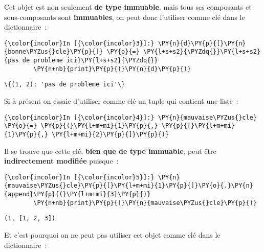     Cet objet est non seulement \textbf{de type immuable}, mais tous ses
composants et sous-composants sont \textbf{immuables}, on peut donc
l'utiliser comme clé dans le dictionnaire~:

    \begin{Verbatim}[commandchars=\\\{\},frame=single,framerule=0.3mm,rulecolor=\color{cellframecolor}]
{\color{incolor}In [{\color{incolor}3}]:} \PY{n}{d}\PY{p}{[}\PY{n}{bonne\PYZus{}cle}\PY{p}{]} \PY{o}{=} \PY{l+s+s2}{\PYZdq{}}\PY{l+s+s2}{pas de probleme ici}\PY{l+s+s2}{\PYZdq{}}
        \PY{n+nb}{print}\PY{p}{(}\PY{n}{d}\PY{p}{)}
\end{Verbatim}


    \begin{Verbatim}[commandchars=\\\{\},frame=single,framerule=0.3mm,rulecolor=\color{cellframecolor}]
\{(1, 2): 'pas de probleme ici'\}
\end{Verbatim}

    Si à présent on essaie d'utiliser comme clé un tuple qui contient une
liste~:

    \begin{Verbatim}[commandchars=\\\{\},frame=single,framerule=0.3mm,rulecolor=\color{cellframecolor}]
{\color{incolor}In [{\color{incolor}4}]:} \PY{n}{mauvaise\PYZus{}cle} \PY{o}{=} \PY{p}{(}\PY{l+m+mi}{1}\PY{p}{,} \PY{p}{[}\PY{l+m+mi}{1}\PY{p}{,} \PY{l+m+mi}{2}\PY{p}{]}\PY{p}{)}
\end{Verbatim}


    Il se trouve que cette clé, \textbf{bien que de type immuable}, peut
être \textbf{indirectement modifiée} puisque~:

    \begin{Verbatim}[commandchars=\\\{\},frame=single,framerule=0.3mm,rulecolor=\color{cellframecolor}]
{\color{incolor}In [{\color{incolor}5}]:} \PY{n}{mauvaise\PYZus{}cle}\PY{p}{[}\PY{l+m+mi}{1}\PY{p}{]}\PY{o}{.}\PY{n}{append}\PY{p}{(}\PY{l+m+mi}{3}\PY{p}{)}
        \PY{n+nb}{print}\PY{p}{(}\PY{n}{mauvaise\PYZus{}cle}\PY{p}{)}
\end{Verbatim}


    \begin{Verbatim}[commandchars=\\\{\},frame=single,framerule=0.3mm,rulecolor=\color{cellframecolor}]
(1, [1, 2, 3])
\end{Verbatim}

    Et c'est pourquoi on ne peut pas utiliser cet objet comme clé dans le
dictionnaire~:


